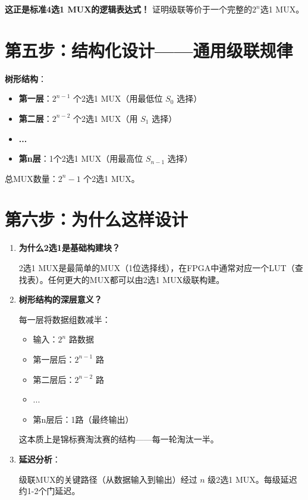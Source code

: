 \textbf{这正是标准4选1 MUX的逻辑表达式！} 证明级联等价于一个完整的$2^n$选1 MUX。

\section{第五步：结构化设计——通用级联规律}

\textbf{树形结构}：

\begin{itemize}
  \item \textbf{第一层}：$2^{n-1}$ 个2选1 MUX（用最低位 $S_0$ 选择）
  \item \textbf{第二层}：$2^{n-2}$ 个2选1 MUX（用 $S_1$ 选择）
  \item \textbf{...}
  \item \textbf{第n层}：1个2选1 MUX（用最高位 $S_{n-1}$ 选择）
\end{itemize}

总MUX数量：$2^n - 1$ 个2选1 MUX。

\section{第六步：为什么这样设计}

\begin{enumerate}
  \item \textbf{为什么2选1是基础构建块？}

  2选1 MUX是最简单的MUX（1位选择线），在FPGA中通常对应一个LUT（查找表）。任何更大的MUX都可以由2选1 MUX级联构建。

  \item \textbf{树形结构的深层意义？}

  每一层将数据组数减半：
  \begin{itemize}
    \item 输入：$2^n$ 路数据
    \item 第一层后：$2^{n-1}$ 路
    \item 第二层后：$2^{n-2}$ 路
    \item ...
    \item 第n层后：1路（最终输出）
  \end{itemize}

  这本质上是锦标赛淘汰赛的结构——每一轮淘汰一半。

  \item \textbf{延迟分析}：

  级联MUX的关键路径（从数据输入到输出）经过 $n$ 级2选1 MUX。每级延迟约1-2个门延迟。
\end{enumerate}


